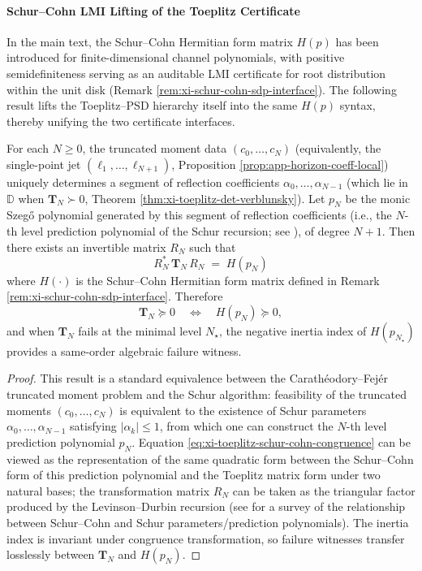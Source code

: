 \paragraph{Schur--Cohn LMI Lifting of the Toeplitz Certificate}
In the main text, the Schur--Cohn Hermitian form matrix \(H(p)\) has been introduced for finite-dimensional channel polynomials, with positive semidefiniteness serving as an auditable LMI certificate for root distribution within the unit disk (Remark \ref{rem:xi-schur-cohn-sdp-interface}).
The following result lifts the Toeplitz--PSD hierarchy itself into the same \(H(p)\) syntax, thereby unifying the two certificate interfaces.

\begin{theorem}\label{thm:xi-toeplitz-schur-cohn-lift}
For each \(N\ge 0\), the truncated moment data \((c_0,\dots,c_N)\) (equivalently, the single-point jet \((\ell_1,\dots,\ell_{N+1})\), Proposition \ref{prop:app-horizon-coeff-local}) uniquely determines a segment of reflection coefficients
\(
\alpha_0,\dots,\alpha_{N-1}
\)
(which lie in \(\mathbb{D}\) when \(\mathbf{T}_N\succ 0\), Theorem \ref{thm:xi-toeplitz-det-verblunsky}).
Let \(p_N\) be the monic Szeg\H{o} polynomial generated by this segment of reflection coefficients (i.e., the \(N\)-th level prediction polynomial of the Schur recursion; see \cite{Simon2005OPUC1}), of degree \(N{+}1\).
Then there exists an invertible matrix \(R_N\) such that
\begin{equation}\label{eq:xi-toeplitz-schur-cohn-congruence}
\boxed{\;
R_N^\ast\,\mathbf{T}_N\,R_N
\;=\;
H(p_N)\;}
\end{equation}
where \(H(\cdot)\) is the Schur--Cohn Hermitian form matrix defined in Remark \ref{rem:xi-schur-cohn-sdp-interface}.
Therefore
\[
\mathbf{T}_N\succeq 0
\quad\Longleftrightarrow\quad
H(p_N)\succeq 0,
\]
and when \(\mathbf{T}_N\) fails at the minimal level \(N_\star\), the negative inertia index of \(H(p_{N_\star})\) provides a same-order algebraic failure witness.
\end{theorem}

\begin{proof}
This result is a standard equivalence between the Carath\'eodory--Fej\'er truncated moment problem and the Schur algorithm: feasibility of the truncated moments \((c_0,\dots,c_N)\) is equivalent to the existence of Schur parameters \(\alpha_0,\dots,\alpha_{N-1}\) satisfying \(|\alpha_k|\le 1\), from which one can construct the \(N\)-th level prediction polynomial \(p_N\).
Equation \eqref{eq:xi-toeplitz-schur-cohn-congruence} can be viewed as the representation of the same quadratic form between the Schur--Cohn form of this prediction polynomial and the Toeplitz matrix form under two natural bases; the transformation matrix \(R_N\) can be taken as the triangular factor produced by the Levinson--Durbin recursion (see \cite{DymYoung1990SchurCohnMatrixPolynomials,Simon2005OPUC1} for a survey of the relationship between Schur--Cohn and Schur parameters/prediction polynomials).
The inertia index is invariant under congruence transformation, so failure witnesses transfer losslessly between \(\mathbf{T}_N\) and \(H(p_N)\).
\end{proof}

